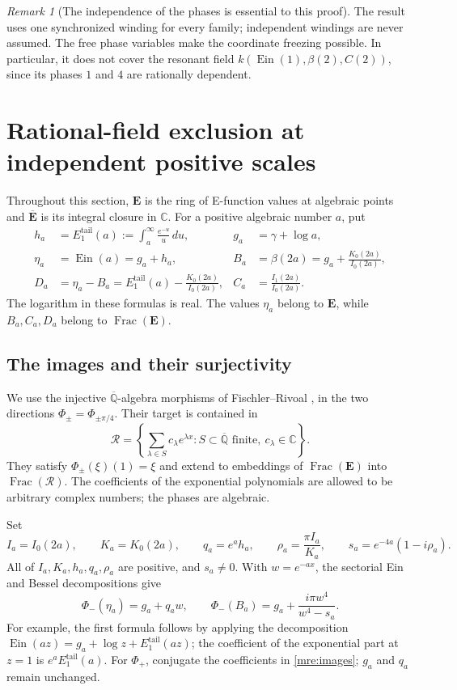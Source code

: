 \documentclass[11pt]{article}
\theoremstyle{definition}
\theoremstyle{remark}
\newtheorem{remark}[theorem]{Remark}
\newcommand{\Qa}{\overline{\mathbb Q}}
\newcommand{\E}{\mathbf E}
\newcommand{\Ebar}{\overline{\mathbf E}}
\newcommand{\Ein}{\operatorname{Ein}}
\begin{document}
\begin{remark}[The independence of the phases is essential to this proof]
The result uses one synchronized winding for every family; independent
windings are never assumed. The free phase variables make the coordinate
freezing possible. In particular, it does not cover the resonant field
$k(\Ein(1),\beta(2),C(2))$, since its phases $1$ and $4$
are rationally dependent.
\end{remark}



\section{Rational-field exclusion at independent positive scales}
\label{mre:section}

Throughout this section, $\E$ is the ring of E-function values at
algebraic points and $\Ebar$ is its integral closure in $\mathbb C$.
For a positive algebraic number $a$, put
\begin{align}
 h_a&=E_1^{\mathrm{tail}}(a):=\int_a^\infty\frac{e^{-u}}u\,du,
 &g_a&=\gamma+\log a,\label{mre:tail}\\
 \eta_a&=\Ein(a)=g_a+h_a,
 &B_a&=\beta(2a)=g_a+\frac{K_0(2a)}{I_0(2a)},\label{mre:values}\\
 D_a&=\eta_a-B_a
     =E_1^{\mathrm{tail}}(a)-\frac{K_0(2a)}{I_0(2a)},
 &C_a&=\frac{I_1(2a)}{I_0(2a)}.\label{mre:D}
\end{align}
The logarithm in these formulas is real. The values $\eta_a$ belong to
$\E$, while $B_a,C_a,D_a$ belong to $\operatorname{Frac}(\E)$.

\subsection{The images and their surjectivity}

We use the injective $\Qa$-algebra morphisms of Fischler--Rivoal
\cite[Proposition~3.1]{FR26}, in the two directions
$\Phi_\pm=\Phi_{\pm\pi/4}$. Their target is contained in
\[
 \mathcal R
 =\left\{\sum_{\lambda\in S}c_\lambda e^{\lambda x}:
       S\subset\Qa\text{ finite},\ c_\lambda\in\mathbb C\right\}.
\]
They satisfy $\Phi_\pm(\xi)(1)=\xi$ and extend to embeddings of
$\operatorname{Frac}(\E)$ into $\operatorname{Frac}(\mathcal R)$.
The coefficients of the exponential polynomials are allowed to be
arbitrary complex numbers; the phases are algebraic.

Set
\[
 I_a=I_0(2a),\qquad K_a=K_0(2a),\qquad
 q_a=e^a h_a,\qquad \rho_a=\frac{\pi I_a}{K_a},\qquad
 s_a=e^{-4a}(1-i\rho_a).
\]
All of $I_a,K_a,h_a,q_a,\rho_a$ are positive, and $s_a\ne0$.
With $w=e^{-ax}$, the sectorial Ein and Bessel decompositions give
\begin{equation}\label{mre:images}
 \Phi_-(\eta_a)=g_a+q_aw,\qquad
 \Phi_-(B_a)=g_a+\frac{i\pi w^4}{w^4-s_a}.
\end{equation}
For example, the first formula follows by applying the decomposition
$\Ein(az)=g_a+\log z+E_1^{\mathrm{tail}}(az)$;
the coefficient of the exponential part at $z=1$ is
$e^aE_1^{\mathrm{tail}}(a)$. For $\Phi_+$, conjugate the coefficients
in \eqref{mre:images}; $g_a$ and $q_a$ remain unchanged.
\end{document}
